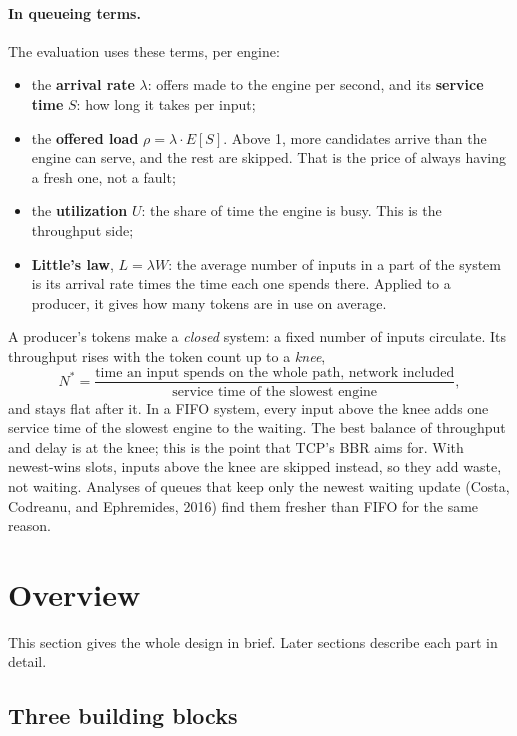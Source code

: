 \documentclass[11pt]{article}
\begin{document}
\paragraph{In queueing terms.} The evaluation uses these terms, per engine:
\begin{itemize}[nosep]
  \item the \textbf{arrival rate} $\lambda$: offers made to the engine per
        second, and its \textbf{service time} $S$: how long it takes per
        input;
  \item the \textbf{offered load} $\rho = \lambda \cdot E[S]$. Above 1,
        more candidates arrive than the engine can serve, and the rest are
        skipped. That is the price of always having a fresh one, not a fault;
  \item the \textbf{utilization} $U$: the share of time the engine is busy.
        This is the throughput side;
  \item \textbf{Little's law}, $L = \lambda W$: the average number of inputs
        in a part of the system is its arrival rate times the time each one
        spends there. Applied to a producer, it gives how many tokens are in
        use on average.
\end{itemize}
A producer's tokens make a \emph{closed} system: a fixed number of inputs
circulate. Its throughput rises with the token count up to a \emph{knee},
\[
  N^* = \frac{\text{time an input spends on the whole path, network
  included}}{\text{service time of the slowest engine}},
\]
and stays flat after it. In a FIFO system, every input above the knee adds
one service time of the slowest engine to the waiting. The best balance of
throughput and delay is at the knee; this is the point that TCP's BBR aims
for. With newest-wins slots, inputs above the knee are skipped instead, so
they add waste, not waiting. Analyses of queues that keep only the newest
waiting update (Costa, Codreanu, and Ephremides, 2016) find them fresher than
FIFO for the same reason.

\section{Overview}
\label{sec:overview}

This section gives the whole design in brief. Later sections describe each
part in detail.

\subsection{Three building blocks}
\end{document}
